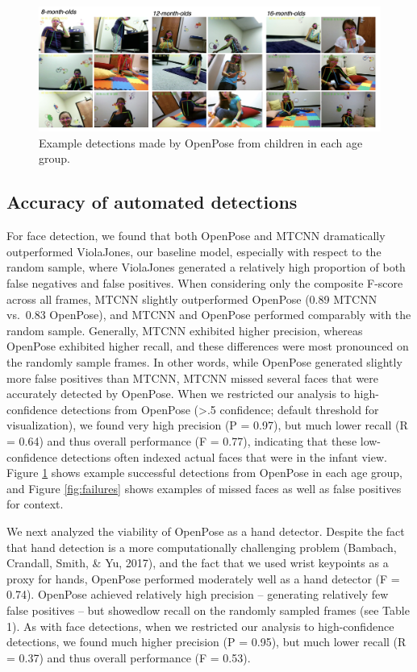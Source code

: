 \documentclass[english,man]{apa6}
\begin{document}
\begin{figure}[H]
\includegraphics[width=1\linewidth]{images/exampe_detections} \caption{Example detections made by OpenPose from children in each age group.}\label{fig:exampledetections}
\end{figure}

\subsection{Accuracy of automated
detections}\label{accuracy-of-automated-detections}

For face detection, we found that both OpenPose and MTCNN dramatically
outperformed ViolaJones, our baseline model, especially with respect to
the random sample, where ViolaJones generated a relatively high
proportion of both false negatives and false positives. When considering
only the composite F-score across all frames, MTCNN slightly
outperformed OpenPose (0.89 MTCNN vs.~0.83 OpenPose), and MTCNN and
OpenPose performed comparably with the random sample. Generally, MTCNN
exhibited higher precision, whereas OpenPose exhibited higher recall,
and these differences were most pronounced on the randomly sample
frames. In other words, while OpenPose generated slightly more false
positives than MTCNN, MTCNN missed several faces that were accurately
detected by OpenPose. When we restricted our analysis to high-confidence
detections from OpenPose (\textgreater{}.5 confidence; default threshold
for visualization), we found very high precision (P = 0.97), but much
lower recall (R = 0.64) and thus overall performance (F = 0.77),
indicating that these low-confidence detections often indexed actual
faces that were in the infant view. Figure \ref{fig:exampledetections}
shows example successful detections from OpenPose in each age group, and
Figure \ref{fig:failures} shows examples of missed faces as well as
false positives for context.

We next analyzed the viability of OpenPose as a hand detector. Despite
the fact that hand detection is a more computationally challenging
problem (Bambach, Crandall, Smith, \& Yu, 2017), and the fact that we
used wrist keypoints as a proxy for hands, OpenPose performed moderately
well as a hand detector (F = 0.74). OpenPose achieved relatively high
precision -- generating relatively few false positives -- but showedlow
recall on the randomly sampled frames (see Table 1). As with face
detections, when we restricted our analysis to high-confidence
detections, we found much higher precision (P = 0.95), but much lower
recall (R = 0.37) and thus overall performance (F = 0.53).
\end{document}
